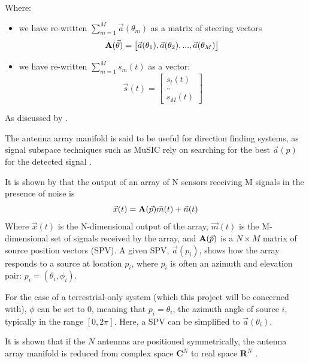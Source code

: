 Where:
\begin{itemize} 
  \item we have re-written \(\sum_{m=1}^{M}\vec{a}(\theta_m)\) as a matrix of steering vectors
\begin{equation} 
  \mathbf{A}(\vec{\theta}) = \begin{bmatrix} \vec{a}(\theta_1), \vec{a}(\theta_2), ..., \vec{a}(\theta_M) \end{bmatrix} \\
\end{equation}
  \item we have re-written  \(\sum_{m=1}^{M}s_m(t)\) as a vector:
\begin{equation}
  \vec{s}(t) = \begin{bmatrix} s_t(t) \\ .. \\ s_M(t) \end{bmatrix}
\end{equation}
\end{itemize}

As discussed by \cite{sleiman2000antenna} \cite{karimi1996manifold} \cite{dacos1995estimating}. 

The antenna array manifold is said to be useful for direction finding systems, as signal subspace techniques such as MuSIC rely on searching for the best \(\vec{a}(p)\) for the detected signal \cite{karimi1996manifold}. 

It is shown by \cite{dacos1995estimating} that the output of an array of N sensors receiving M signals in the presence of noise is
\begin{equation}
\vec{x}(t) = \mathbf{A}(\vec{p})\vec{m}(t) + \vec{n}(t)
\end{equation}
Where \(\vec{x}(t)\) is the N-dimensional output of the array, \(\vec{m}(t)\) is the M-dimensional set of signals received by the array, and \(\mathbf{A}(\vec{p})\) is a \(N \times M\) matrix of source position vectors (SPV). 
A given SPV, \(\vec{a}(p_i)\), shows how the array responds to a source at location \(p_i\), where \(p_i\) is often an azimuth and elevation pair: \(p_i = (\theta_i, \phi_i)\).

For the case of a terrestrial-only system (which this project will be concerned with), \(\phi\) can be set to 0, meaning that \(p_i = \theta_i\), the azimuth angle of source \(i\), typically in the range \([0, 2\pi]\). Here, a SPV can be simplified to \(\vec{a}(\theta_i)\).

It is shown that if the \(N\) antennas are positioned symmetrically, the antenna array manifold is reduced from complex space \(\mathbf{C}^N\) to real space \(\mathbf{R}^N\) \cite{dacos1995estimating}.
